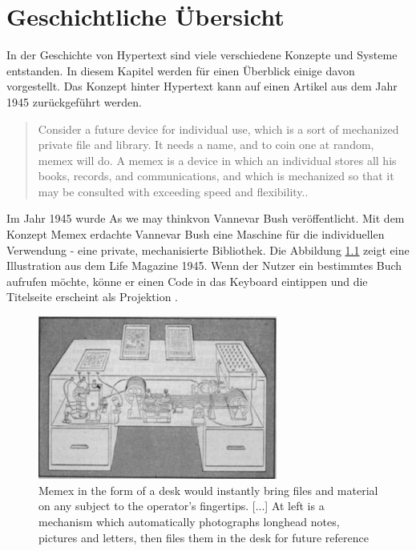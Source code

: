 \chapter{Geschichtliche Übersicht}
\label{ch:Geschichtlich}

In der Geschichte von Hypertext sind viele verschiedene Konzepte und Systeme entstanden. In diesem Kapitel werden für einen Überblick einige davon vorgestellt. Das Konzept hinter Hypertext kann auf einen Artikel aus dem Jahr 1945 zurückgeführt werden.

\begin{quote}
	\glqq Consider a future device for individual use, which is a sort of mechanized private file and library. It needs a name, and to coin one at random, memex will do. A memex is a device in which an individual stores all his books, records, and communications, and which is mechanized so that it may be consulted with exceeding speed and flexibility.\grqq{ }\cite[Section 6]{Bush1945}.
\end{quote}

Im Jahr 1945 wurde \glqq As we may think\grqq{ }von Vannevar Bush veröffentlicht. Mit dem Konzept \glqq Memex\grqq{ } erdachte Vannevar Bush eine Maschine für die individuellen Verwendung - eine private, mechanisierte Bibliothek. Die Abbildung \ref{fig:memex} zeigt eine Illustration aus dem Life Magazine 1945. Wenn der Nutzer ein bestimmtes Buch aufrufen möchte, könne er einen Code in das Keyboard eintippen und die Titelseite erscheint als Projektion \cite[S.121]{Life1945} \cite[Section 6]{Bush1945}. 

\begin{figure}[H]
	\centering
	\includegraphics[width=0.7\textwidth]{image/memex}
	\caption{\glqq Memex in the form of a desk would instantly bring files and material on any subject to the operator's fingertips. [...] At left is a mechanism which automatically photographs longhead notes, pictures and letters, then files them in the desk for future reference\grqq{ } \cite[S.123]{Life1945}}
	\label{fig:memex}
\end{figure}

